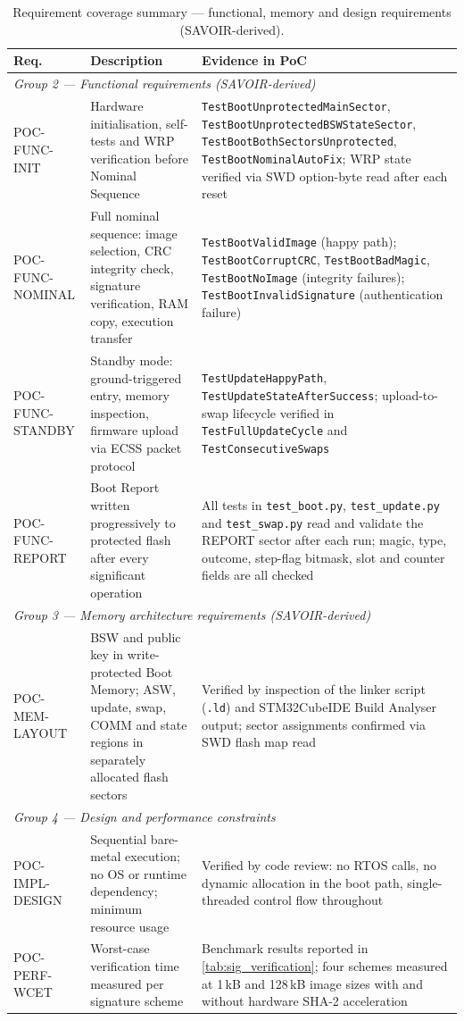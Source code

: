 \begin{table}[H]
\centering
\small
\begin{tabular}{|l|p{5cm}|p{5cm}|}
\hline
\textbf{Req.} & \textbf{Description} & \textbf{Evidence in PoC} \\
\hline
\multicolumn{3}{|l|}{\textit{Group 2 — Functional requirements (SAVOIR-derived)}} \\
\hline
POC-FUNC-INIT & Hardware initialisation, self-tests and WRP verification before Nominal Sequence & \texttt{TestBootUnprotectedMainSector}, \texttt{TestBootUnprotectedBSWStateSector}, \texttt{TestBootBothSectorsUnprotected}, \texttt{TestBootNominalAutoFix}; WRP state verified via SWD option-byte read after each reset \\
\hline
POC-FUNC-NOMINAL & Full nominal sequence: image selection, CRC integrity check, signature verification, RAM copy, execution transfer & \texttt{TestBootValidImage} (happy path); \texttt{TestBootCorruptCRC}, \texttt{TestBootBadMagic}, \texttt{TestBootNoImage} (integrity failures); \texttt{TestBootInvalidSignature} (authentication failure) \\
\hline
POC-FUNC-STANDBY & Standby mode: ground-triggered entry, memory inspection, firmware upload via ECSS packet protocol & \texttt{TestUpdateHappyPath}, \texttt{TestUpdateStateAfterSuccess}; upload-to-swap lifecycle verified in \texttt{TestFullUpdateCycle} and \texttt{TestConsecutiveSwaps} \\
\hline
POC-FUNC-REPORT & Boot Report written progressively to protected flash after every significant operation & All tests in \texttt{test\_boot.py}, \texttt{test\_update.py} and \texttt{test\_swap.py} read and validate the REPORT sector after each run; magic, type, outcome, step-flag bitmask, slot and counter fields are all checked \\
\hline
\multicolumn{3}{|l|}{\textit{Group 3 — Memory architecture requirements (SAVOIR-derived)}} \\
\hline
POC-MEM-LAYOUT & BSW and public key in write-protected Boot Memory; ASW, update, swap, COMM and state regions in separately allocated flash sectors & Verified by inspection of the linker script (\texttt{.ld}) and STM32CubeIDE Build Analyser output; sector assignments confirmed via SWD flash map read \\
\hline
\multicolumn{3}{|l|}{\textit{Group 4 — Design and performance constraints}} \\
\hline
POC-IMPL-DESIGN & Sequential bare-metal execution; no OS or runtime dependency; minimum resource usage & Verified by code review: no RTOS calls, no dynamic allocation in the boot path, single-threaded control flow throughout \\
\hline
POC-PERF-WCET & Worst-case verification time measured per signature scheme & Benchmark results reported in \autoref{tab:sig_verification}; four schemes measured at 1\,kB and 128\,kB image sizes with and without hardware SHA-2 acceleration \\
\hline
\end{tabular}
\caption{Requirement coverage summary — functional, memory and design requirements (SAVOIR-derived).}
\label{tab:req-verification-func}
\end{table}



